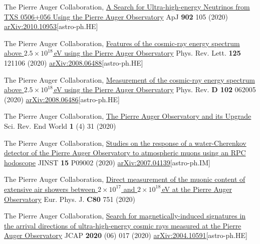\begin{etaremune}
\item {}The Pierre Auger Collaboration, \href{https://doi.org/10.3847/1538-4357/abb476}{A Search for Ultra-high-energy Neutrinos from TXS 0506+056 Using the Pierre Auger Observatory} ApJ {\bf{902}} 105 (2020) \href{https://arxiv.org/abs/2010.10953}{arXiv:2010.10953}[astro-ph.HE]

\item {}The Pierre Auger Collaboration, \href{https://doi.org/10.1103/PhysRevLett.125.121106}{Features of the cosmic-ray energy spectrum above $2.5\times 10^{18}$\,eV using the Pierre Auger Observatory} Phys. Rev. Lett. {\bf{125}} 121106 (2020) \href{https://arxiv.org/abs/2008.06488}{arXiv:2008.06488}[astro-ph.HE]

\item {}The Pierre Auger Collaboration, \href{https://doi.org/10.1103/PhysRevD.102.062005}{Measurement of the cosmic-ray energy spectrum above $2.5\times 10^{18}$\,eV using the Pierre Auger Observatory} Phys. Rev. {\bf{D 102}} 062005 (2020) \href{https://arxiv.org/abs/2008.06486}{arXiv:2008.06486}[astro-ph.HE]

\item {}The Pierre Auger Collaboration, \href{https://doi.org/10.52712/sciencereviews.v1i4.31}{The Pierre Auger Observatory and its Upgrade} Sci. Rev. End World {\bf{1}} (4) 31 (2020)

\item {}The Pierre Auger Collaboration, \href{https://doi.org/10.1088/1748-0221/15/09/P09002}{Studies on the response of a water-Cherenkov detector of the Pierre Auger Observatory to atmospheric muons using an RPC hodoscope} JINST {\bf{15}} P09002 (2020) \href{https://arxiv.org/abs/2007.04139}{arXiv:2007.04139}[astro-ph.IM]

\item {}The Pierre Auger Collaboration, \href{https://doi.org/10.1140/epjc/s10052-020-8055-y}{Direct measurement of the muonic content of extensive air showers between $2\times 10^{17}$ and $2\times 10^{18}$\,eV at the Pierre Auger Observatory} Eur. Phys. J. {\bf{C80}} 751 (2020)


\item {}The Pierre Auger Collaboration, \href{https://doi.org/10.1088/1475-7516/2020/06/017}{Search for magnetically-induced signatures in the arrival directions of ultra-high-energy cosmic rays measured at the Pierre Auger Observatory} JCAP {\bf{2020}} (06) 017 (2020) \href{https://arxiv.org/abs/2004.10591}{arXiv:2004.10591}[astro-ph.HE]


\end{etaremune}
